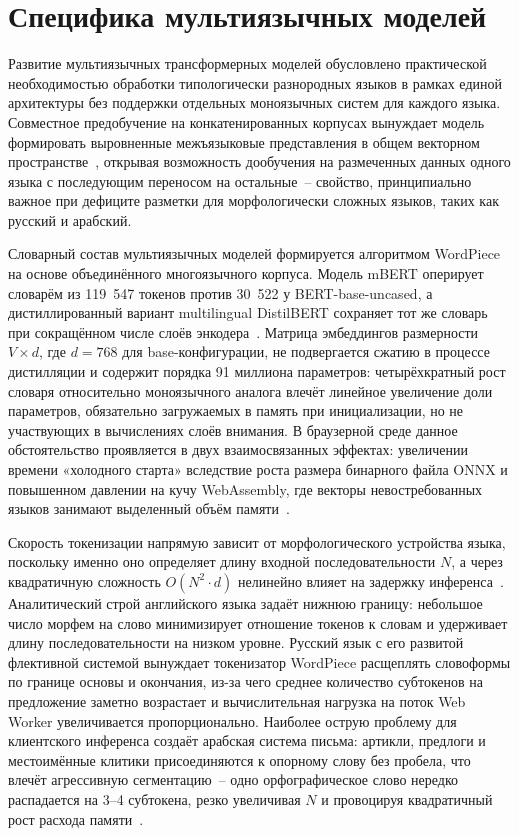 \section{Специфика мультиязычных моделей} \label{sec:специфика_мультиязычных_моделей}

Развитие мультиязычных трансформерных моделей обусловлено практической необходимостью обработки типологически разнородных языков в рамках единой архитектуры без поддержки отдельных моноязычных систем для каждого языка. Совместное предобучение на конкатенированных корпусах вынуждает модель формировать выровненные межъязыковые представления в общем векторном пространстве~\cite{conneau2020unsupervised}, открывая возможность дообучения на размеченных данных одного языка с последующим переносом на остальные~– свойство, принципиально важное при дефиците разметки для морфологически сложных языков, таких как русский и арабский.

Словарный состав мультиязычных моделей формируется алгоритмом WordPiece на основе объединённого многоязычного корпуса. Модель mBERT оперирует словарём из 119~547 токенов против 30~522 у BERT-base-uncased, а дистиллированный вариант multilingual DistilBERT сохраняет тот же словарь при сокращённом числе слоёв энкодера~\cite{sanh2019distilbert}. Матрица эмбеддингов размерности $V \times d$, где $d = 768$ для base-конфигурации, не подвергается сжатию в процессе дистилляции и содержит порядка 91 миллиона параметров: четырёхкратный рост словаря относительно моноязычного аналога влечёт линейное увеличение доли параметров, обязательно загружаемых в память при инициализации, но не участвующих в вычислениях слоёв внимания. В браузерной среде данное обстоятельство проявляется в двух взаимосвязанных эффектах: увеличении времени «холодного старта» вследствие роста размера бинарного файла ONNX и повышенном давлении на кучу WebAssembly, где векторы невостребованных языков занимают выделенный объём памяти~\cite{pfeiffer2022lifting}.

Скорость токенизации напрямую зависит от морфологического устройства языка, поскольку именно оно определяет длину входной последовательности $N$, а через квадратичную сложность $O(N^2 \cdot d)$ нелинейно влияет на задержку инференса~\cite{rust2021multilingual}. Аналитический строй английского языка задаёт нижнюю границу: небольшое число морфем на слово минимизирует отношение токенов к словам и удерживает длину последовательности на низком уровне. Русский язык с его развитой флективной системой вынуждает токенизатор WordPiece расщеплять словоформы по границе основы и окончания, из-за чего среднее количество субтокенов на предложение заметно возрастает и вычислительная нагрузка на поток Web Worker увеличивается пропорционально. Наиболее острую проблему для клиентского инференса создаёт арабская система письма: артикли, предлоги и местоимённые клитики присоединяются к опорному слову без пробела, что влечёт агрессивную сегментацию~– одно орфографическое слово нередко распадается на 3–4 субтокена, резко увеличивая $N$ и провоцируя квадратичный рост расхода памяти~\cite{farhan2024arabic}.

